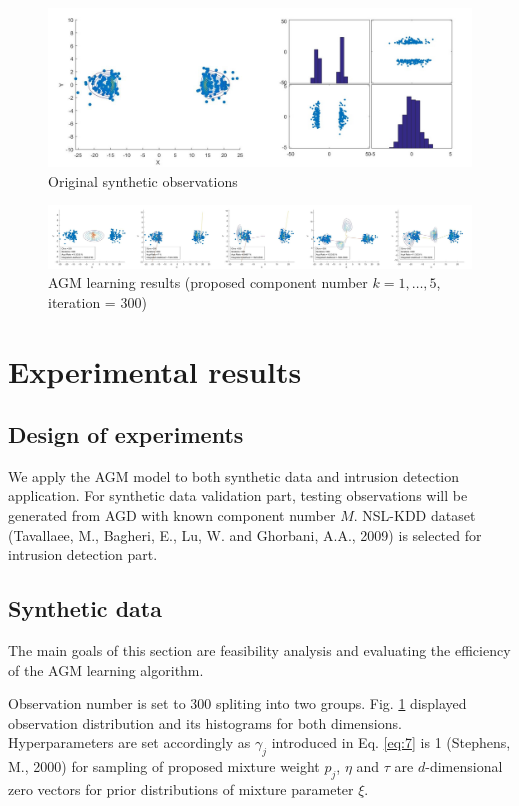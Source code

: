 \documentclass[conference]{IEEEtran}
\begin{document}
\begin{figure}[b]
\includegraphics[height=0.3\textheight]{12.jpg}
\caption{Original synthetic observations}
\label{fig:1}
\end{figure}

\begin{figure}[b]
\includegraphics[height=0.12\textheight]{23456.jpg}
\caption{AGM learning results (proposed component number $k = 1,\dots,5$, iteration = 300)}
\label{fig:2}
\end{figure}

\section{Experimental results}
\subsection{Design of experiments}
We apply the AGM model to both synthetic data and intrusion detection application. For synthetic data validation part, testing observations will be generated from AGD with known component number $M$. NSL-KDD dataset (Tavallaee, M., Bagheri, E., Lu, W. and Ghorbani, A.A., 2009) \cite{b10} is selected for intrusion detection part.

\subsection{Synthetic data}
The main goals of this section are feasibility analysis and evaluating the efficiency of the AGM learning algorithm.

Observation number is set to 300 spliting into two groups. Fig. \ref{fig:1} displayed observation distribution and its histograms for both dimensions. Hyperparameters are set accordingly as $\gamma_j$ introduced in Eq. \eqref{eq:7} is 1 (Stephens, M., 2000) \cite{b11} for sampling of proposed mixture weight $p_j$, $\eta$ and $\tau$ are $d$-dimensional zero vectors for prior distributions of mixture parameter $\xi$.
\end{document}
